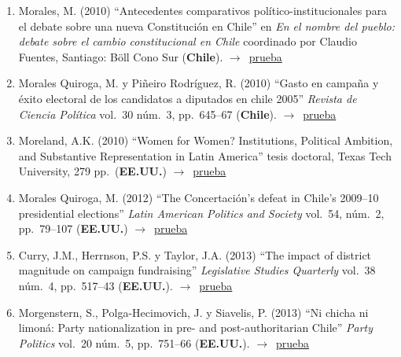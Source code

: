 \documentclass[12 pt, letter]{article}
\newenvironment{CitasMiTrabajo}{
    \begin{footnotesize}
    \begin{enumerate}[label={\footnotesize\emph{cita~\arabic*}},ref=\arabic*] %
        \setlength{\itemsep}{.1\itemsep}
        \setlength{\parskip}{.1\parskip}
    }{\end{enumerate}\end{footnotesize}}
\begin{document}
\begin{CitasMiTrabajo}
        \item Morales, M. (2010)
        ``Antecedentes comparativos pol\'itico-institucionales para el debate sobre una nueva Constituci\'on en Chile''
        en \emph{En el nombre del pueblo: debate sobre el cambio constitucional en Chile} coordinado por Claudio Fuentes, Santiago: B\"oll Cono Sur (\textbf{Chile}). $\rightarrow$~\href{http://ericmagar.com/cv/cites/mrs/morales2010.excerpt.pdf}{prueba}

        \item Morales Quiroga, M. y Pi\~neiro Rodr\'iguez, R. (2010)
        ``Gasto en campa\~na y \'exito electoral de los candidatos a diputados en chile 2005''
        \emph{Revista de Ciencia Pol\'itica} vol.\ 30 n\'um.\ 3, pp.\ 645--67 (\textbf{Chile}). $\rightarrow$~\href{http://ericmagar.com/cv/cites/mrs/moralesPineiro2010rcp.pdf}{prueba}

        \item Moreland, A.K. (2010)
        ``Women for Women? Institutions, Political Ambition, and Substantive Representation in Latin America'' tesis doctoral, Texas Tech University, 279 pp.\ (\textbf{EE.UU.}) $\rightarrow$~\href{http://ericmagar.com/cv/cites/mrs/MORELAND-DISSERTATION2010.excerpt.pdf}{prueba}

        \item Morales Quiroga, M. (2012) 
        ``The Concertaci\'on's defeat in Chile's 2009--10 presidential elections''
        \emph{Latin American Politics and Society} vol.\ 54, n\'um.\ 2, pp.\ 79--107 (\textbf{EE.UU.}) $\rightarrow$~\href{http://ericmagar.com/cv/cites/mrs/morales2012.pdf}{prueba}


        \item Curry, J.M., Herrnson, P.S. y Taylor, J.A. (2013)
        ``The impact of district magnitude on campaign fundraising''
        \emph{Legislative Studies Quarterly} vol.\ 38 n\'um.\ 4, pp.\ 517--43 (\textbf{EE.UU.}). $\rightarrow$~\href{http://ericmagar.com/cv/cites/mrs/curryEtAl2013lsq.excerpts.pdf}{prueba}

        \item Morgenstern, S., Polga-Hecimovich, J. y Siavelis, P. (2013)
        ``Ni chicha ni limon\'a: Party nationalization in pre- and post-authoritarian Chile''
        \emph{Party Politics} vol.\ 20 n\'um.\ 5, pp.\ 751--66 (\textbf{EE.UU.}). $\rightarrow$~\href{http://ericmagar.com/cv/cites/mrs/morgenstern.polga.siavelisPtyNatChile2014pp.pdf}{prueba}


\end{CitasMiTrabajo}
\end{document}
